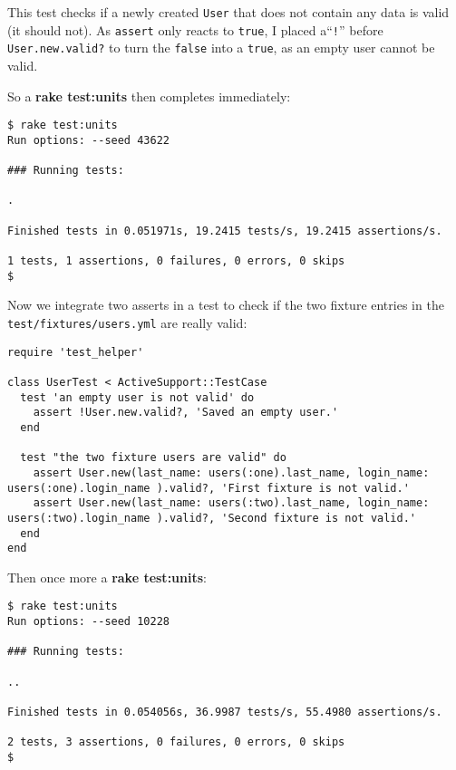 \documentclass[a4paper]{book}
\begin{document}
This test checks if a newly created \texttt{User} that does not contain any data is valid (it should not). As \texttt{assert} only reacts to \texttt{true}, I placed a“\texttt{!}” before \texttt{User.new.valid?} to turn the \texttt{false} into a \texttt{true}, as an empty user cannot be valid.

So a \textbf{rake test:units} then completes immediately:

\begin{shaded}\begin{verbatim}
$ rake test:units
Run options: --seed 43622

### Running tests:

.

Finished tests in 0.051971s, 19.2415 tests/s, 19.2415 assertions/s.

1 tests, 1 assertions, 0 failures, 0 errors, 0 skips
$
\end{verbatim}\end{shaded}

Now we integrate two asserts in a test to check if the two fixture entries in the \texttt{test/fixtures/users.yml} are really valid:

\begin{shaded}\begin{verbatim}
require 'test_helper'

class UserTest < ActiveSupport::TestCase
  test 'an empty user is not valid' do
    assert !User.new.valid?, 'Saved an empty user.'
  end

  test "the two fixture users are valid" do
    assert User.new(last_name: users(:one).last_name, login_name: users(:one).login_name ).valid?, 'First fixture is not valid.'
    assert User.new(last_name: users(:two).last_name, login_name: users(:two).login_name ).valid?, 'Second fixture is not valid.'
  end
end
\end{verbatim}\end{shaded}

Then once more a \textbf{rake test:units}:

\begin{shaded}\begin{verbatim}
$ rake test:units
Run options: --seed 10228

### Running tests:

..

Finished tests in 0.054056s, 36.9987 tests/s, 55.4980 assertions/s.

2 tests, 3 assertions, 0 failures, 0 errors, 0 skips
$
\end{verbatim}\end{shaded}
\end{document}

